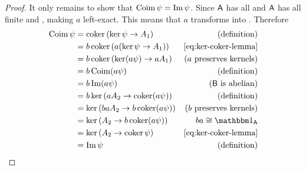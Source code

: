 \documentclass[../main.tex]{subfiles}
\begin{document}
\begin{proof}
  It only remains to show that \(\operatorname*{Coim} \psi = \operatorname*{Im} \psi\).
  Since \(\mathsf{A}\) has all  and  \(\mathsf{A}\) has all finite  and , making \(a\) left-exact.
  This means that \(a\) transforms  into .
  Therefore
  \begin{align*}
    \coim \psi &= \coker \left( \ker \psi \to A_{1} \right)      & (\text{definition}) \\
            &= b\coker \left( a(\ker \psi \to A_{1}) \right)  & \eqref{eq:ker-coker-lemma} \\
            &= b\coker \left( \ker(a\psi) \to aA_{1} \right)  & (a\text{ preserves kernels}) \\
            &= b\coim (a\psi)                                & (\text{definition}) \\
            &= b\im (a\psi)                                  & (\category{B} \text{ is abelian}) \\
            &= b\ker \left( aA_{2} \to \coker(a\psi) \right)  & (\text{definition}) \\
            &= \ker \left( baA_{2} \to b\coker(a\psi) \right) & (b\text{ preserves kernels}) \\
            &= \ker \left( A_{2} \to b\coker(a\psi) \right)   & ba \cong \id_{\category{A}}\\
            &= \ker \left( A_{2} \to \coker \psi \right)      & \eqref{eq:ker-coker-lemma} \\
            &= \im \psi                                     & (\text{definition})
  \end{align*}
\end{proof}
\end{document}
